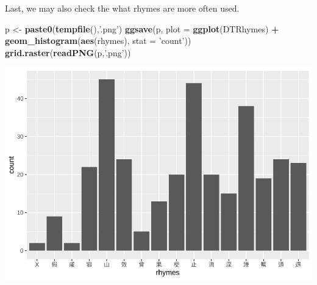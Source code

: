 \documentclass[]{article}
\newenvironment{Shaded}{\begin{snugshade}}{\end{snugshade}}
\newcommand{\DataTypeTok}[1]{\textcolor[rgb]{0.13,0.29,0.53}{#1}}
\newcommand{\KeywordTok}[1]{\textcolor[rgb]{0.13,0.29,0.53}{\textbf{#1}}}
\newcommand{\NormalTok}[1]{#1}
\newcommand{\OperatorTok}[1]{\textcolor[rgb]{0.81,0.36,0.00}{\textbf{#1}}}
\newcommand{\StringTok}[1]{\textcolor[rgb]{0.31,0.60,0.02}{#1}}
\begin{document}
Last, we may also check the what rhymes are more often used.

\begin{Shaded}
\begin{Highlighting}[]
\NormalTok{p <-}\StringTok{ }\KeywordTok{paste0}\NormalTok{(}\KeywordTok{tempfile}\NormalTok{(),}\StringTok{'.png'}\NormalTok{) }
\KeywordTok{ggsave}\NormalTok{(p, }\DataTypeTok{plot =} \KeywordTok{ggplot}\NormalTok{(DTRhymes) }\OperatorTok{+}\StringTok{ }\KeywordTok{geom_histogram}\NormalTok{(}\KeywordTok{aes}\NormalTok{(rhymes), }\DataTypeTok{stat =} \StringTok{'count'}\NormalTok{))}
\KeywordTok{grid.raster}\NormalTok{(}\KeywordTok{readPNG}\NormalTok{(p,}\StringTok{'.png'}\NormalTok{))}
\end{Highlighting}
\end{Shaded}

\includegraphics{main_files/figure-latex/unnamed-chunk-12-1.pdf}
\end{document}
